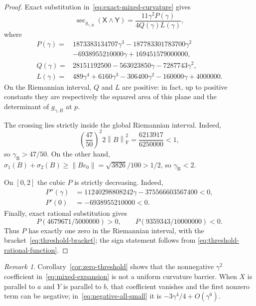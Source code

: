\documentclass[11pt]{amsart}
\theoremstyle{definition}
\theoremstyle{remark}
\newtheorem{remark}[theorem]{Remark}
\DeclareMathOperator{\secop}{sec}
\newcommand{\norm}[1]{\left\lVert #1\right\rVert}
\begin{document}
\begin{proof}
Exact substitution in~\eqref{eq:exact-mixed-curvature} gives
\begin{equation}\label{eq:threshold-rational-function}
 \secop_{g_{\gamma,B}}(\mathsf X\wedge\mathsf Y)
 =\frac{11\gamma^2P(\gamma)}{4Q(\gamma)L(\gamma)},
\end{equation}
where
\begin{align*}
 P(\gamma)={}&1873383134707\gamma^3
 -187783301783700\gamma^2\\
 &-6938955210000\gamma+169451579000000,\\
 Q(\gamma)={}&28151192500-563023850\gamma-7287743\gamma^2,\\
 L(\gamma)={}&489\gamma^4+6160\gamma^3-306400\gamma^2
                    -160000\gamma+4000000.
\end{align*}
On the Riemannian interval, $Q$ and $L$ are positive: in fact, up to
positive constants they are respectively the squared area of this
plane and the determinant of $g_{\gamma,B}$ at $p$.

The crossing lies strictly inside the global Riemannian interval.
Indeed,
\[
 \left(\frac{47}{50}\right)^2 2\norm{B}_{\mathrm F}^2
 =\frac{6213917}{6250000}<1,
\]
so $\gamma_{\mathrm R}>47/50$.  On the other hand,
$\sigma_1(B)+\sigma_2(B)\geq\norm{Be_0}
=\sqrt{3826}/100>1/2$, so $\gamma_{\mathrm R}<2$.

On $[0,2]$ the cubic $P$ is strictly decreasing.  Indeed,
\[
 \begin{aligned}
  P''(\gamma)&=11240298808242\gamma-375566603567400<0,\\
  P'(0)&=-6938955210000<0.
 \end{aligned}
\]
Finally, exact rational substitution gives
\[
 P(4679671/5000000)>0,\qquad
 P(9359343/10000000)<0.
\]
Thus $P$ has exactly one zero in the Riemannian interval, with the
bracket~\eqref{eq:threshold-bracket}; the sign statement follows from
\eqref{eq:threshold-rational-function}.
\end{proof}

\begin{remark}
Corollary~\ref{cor:zero-threshold} shows that the nonnegative
$\gamma^2$ coefficient in~\eqref{eq:mixed-expansion} is not a uniform
curvature barrier.  When $X$ is parallel to $a$ and $Y$ is parallel to
$b$, that coefficient vanishes and the first nonzero term can be
negative; in~\eqref{eq:negative-all-small} it is
$-3\gamma^4/4+O(\gamma^6)$.
\end{remark}
\end{document}
